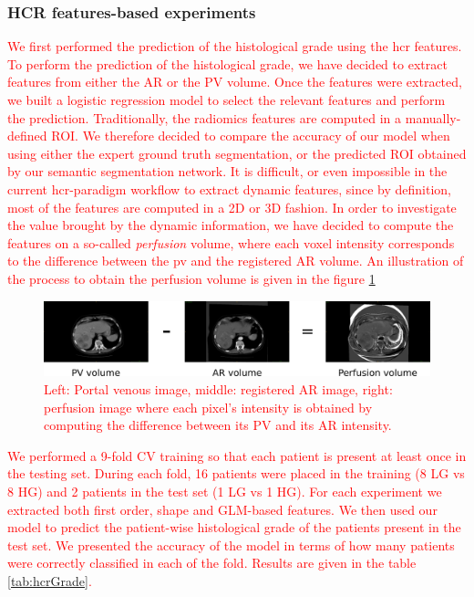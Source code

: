 \subsubsection{HCR features-based experiments}
\textcolor{red}
{
We first performed the prediction of the histological grade using the \ac{hcr} features.
To perform the prediction of the histological grade, we have decided to extract features from either the AR or the PV volume.
Once the features were extracted, we built a logistic regression model to select the relevant features and perform the prediction.
Traditionally, the radiomics features are computed in a manually-defined ROI. We therefore decided to compare the accuracy of our model when using either the expert ground truth segmentation, or the predicted ROI obtained by our semantic segmentation network.
It is difficult, or even impossible in the current \ac{hcr}-paradigm workflow to extract dynamic features, since by definition, most of the features are computed in a 2D or 3D fashion. 
In order to investigate the value brought by the dynamic information, we have decided to compute the features on a so-called \textit{perfusion} volume, where each voxel intensity corresponds to the difference between the \ac{pv} and the registered AR volume. An illustration of the process to obtain the perfusion volume is given in the figure \ref{fig:perfusion}
\begin{figure}
\begin{mdframed}[backgroundcolor=blue!50,linecolor=blue!50]
	\centering
	\includegraphics[width=0.9\linewidth]{Contributions/images/perfusion}
	\caption{Left: Portal venous image, middle: registered AR image, right: perfusion image where each pixel's intensity is obtained by computing the difference between its PV and its AR intensity.}
	\label{fig:perfusion}
\end{mdframed}
\end{figure}
We performed a 9-fold CV training so that each patient is present at least once in the testing set. During each fold, 16 patients were placed in the training (8 LG vs 8 HG) and 2 patients in the test set (1 LG vs 1 HG). For each experiment we extracted both first order, shape and GLM-based features. We then used our model to predict the patient-wise histological grade of the patients present in the test set. We presented the accuracy of the model in terms of how many patients were correctly classified in each of the fold. Results are given in the table \ref{tab:hcrGrade}.
}
